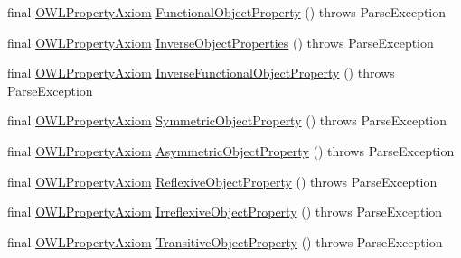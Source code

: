 \begin{DoxyCompactItemize}
\item 
final \hyperlink{interfaceorg_1_1semanticweb_1_1owlapi_1_1model_1_1_o_w_l_property_axiom}{O\-W\-L\-Property\-Axiom} \hyperlink{classorg_1_1coode_1_1owlapi_1_1functionalparser_1_1_o_w_l_functional_syntax_parser_aaabd3e49815dc482b508816caed12f26}{Functional\-Object\-Property} ()  throws Parse\-Exception 
\item 
final \hyperlink{interfaceorg_1_1semanticweb_1_1owlapi_1_1model_1_1_o_w_l_property_axiom}{O\-W\-L\-Property\-Axiom} \hyperlink{classorg_1_1coode_1_1owlapi_1_1functionalparser_1_1_o_w_l_functional_syntax_parser_a2310e3cf5cdf56bc5c7fcc3bd65eb5c2}{Inverse\-Object\-Properties} ()  throws Parse\-Exception 
\item 
final \hyperlink{interfaceorg_1_1semanticweb_1_1owlapi_1_1model_1_1_o_w_l_property_axiom}{O\-W\-L\-Property\-Axiom} \hyperlink{classorg_1_1coode_1_1owlapi_1_1functionalparser_1_1_o_w_l_functional_syntax_parser_a6b530ca14c719ef0a8cca4d462074e86}{Inverse\-Functional\-Object\-Property} ()  throws Parse\-Exception 
\item 
final \hyperlink{interfaceorg_1_1semanticweb_1_1owlapi_1_1model_1_1_o_w_l_property_axiom}{O\-W\-L\-Property\-Axiom} \hyperlink{classorg_1_1coode_1_1owlapi_1_1functionalparser_1_1_o_w_l_functional_syntax_parser_a4f6331e08c597611482da3d686a94cee}{Symmetric\-Object\-Property} ()  throws Parse\-Exception 
\item 
final \hyperlink{interfaceorg_1_1semanticweb_1_1owlapi_1_1model_1_1_o_w_l_property_axiom}{O\-W\-L\-Property\-Axiom} \hyperlink{classorg_1_1coode_1_1owlapi_1_1functionalparser_1_1_o_w_l_functional_syntax_parser_a1e996755fd0d71b6c308e576764289c2}{Asymmetric\-Object\-Property} ()  throws Parse\-Exception 
\item 
final \hyperlink{interfaceorg_1_1semanticweb_1_1owlapi_1_1model_1_1_o_w_l_property_axiom}{O\-W\-L\-Property\-Axiom} \hyperlink{classorg_1_1coode_1_1owlapi_1_1functionalparser_1_1_o_w_l_functional_syntax_parser_ae66a9ae7bc406d665d45786cd4f7a468}{Reflexive\-Object\-Property} ()  throws Parse\-Exception 
\item 
final \hyperlink{interfaceorg_1_1semanticweb_1_1owlapi_1_1model_1_1_o_w_l_property_axiom}{O\-W\-L\-Property\-Axiom} \hyperlink{classorg_1_1coode_1_1owlapi_1_1functionalparser_1_1_o_w_l_functional_syntax_parser_aba9e9e1349c6ef0c48d5d24da53c15b4}{Irreflexive\-Object\-Property} ()  throws Parse\-Exception 
\item 
final \hyperlink{interfaceorg_1_1semanticweb_1_1owlapi_1_1model_1_1_o_w_l_property_axiom}{O\-W\-L\-Property\-Axiom} \hyperlink{classorg_1_1coode_1_1owlapi_1_1functionalparser_1_1_o_w_l_functional_syntax_parser_a15c7c9977ce335aa0cae53ca49c21845}{Transitive\-Object\-Property} ()  throws Parse\-Exception 

\end{DoxyCompactItemize}
